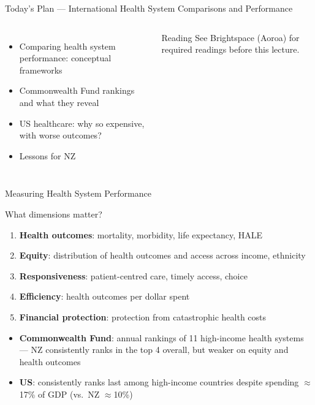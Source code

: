 \documentclass[aspectratio=169, 12pt]{beamer}
\newcommand{\planslide}[2]{%
  \begin{frame}{Today's Plan — #1}
    \begin{columns}
      \column{0.6\textwidth}
      \begin{itemize}#2\end{itemize}
      \column{0.38\textwidth}
      \begin{alertblock}{Reading}
        \footnotesize See Brightspace (Aoroa) for required readings before this lecture.
      \end{alertblock}
    \end{columns}
  \end{frame}}
\begin{document}
\planslide{International Health System Comparisons and Performance}{
  \item Comparing health system performance: conceptual frameworks
  \item Commonwealth Fund rankings and what they reveal
  \item US healthcare: why so expensive, with worse outcomes?
  \item Lessons for NZ
}

\begin{frame}{Measuring Health System Performance}
  \begin{block}{What dimensions matter?}
    \begin{enumerate}
      \item \textbf{Health outcomes}: mortality, morbidity, life expectancy, HALE
      \item \textbf{Equity}: distribution of health outcomes and access across income, ethnicity
      \item \textbf{Responsiveness}: patient-centred care, timely access, choice
      \item \textbf{Efficiency}: health outcomes per dollar spent
      \item \textbf{Financial protection}: protection from catastrophic health costs
    \end{enumerate}
  \end{block}
  \vspace{0.3em}
  \begin{itemize}
    \item \textbf{Commonwealth Fund}: annual rankings of 11 high-income health systems ---
          NZ consistently ranks in the top 4 overall, but weaker on equity and health outcomes
    \item \textbf{US}: consistently ranks last among high-income countries despite spending
          $\approx$17\% of GDP (vs.\ NZ $\approx$10\%)
  \end{itemize}
\end{frame}
\end{document}
